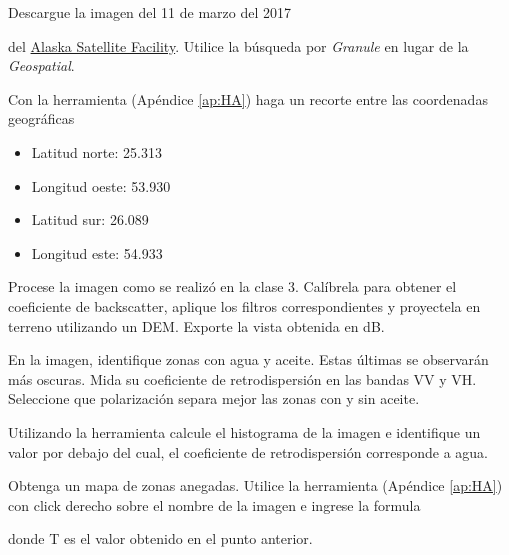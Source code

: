 \begin{que}
    Descargue la imagen del 11 de marzo del 2017
    \begin{center}\end{center} del \href{https://vertex.daac.asf.alaska.edu/}{Alaska Satellite Facility}. Utilice la búsqueda por \emph{Granule} en lugar de la \emph{Geospatial}.
\end{que}

\begin{que}
    Con la herramienta  (Apéndice \ref{ap:HA}) haga un recorte entre las coordenadas geográficas
    \begin{itemize}
        \item Latitud norte: 25.313
        \item Longitud oeste: 53.930
        \item Latitud sur: 26.089
        \item Longitud este: 54.933
    \end{itemize}

\end{que}

\begin{que}
    Procese la imagen como se realizó en la clase 3. Calíbrela para obtener el coeficiente de backscatter, aplique los filtros correspondientes y proyectela en terreno utilizando un DEM. Exporte la vista obtenida en dB.
\end{que}

\begin{que}
    En la imagen, identifique zonas con agua y aceite. Estas últimas se observarán más oscuras. Mida su coeficiente de retrodispersión en las bandas VV y VH. Seleccione que polarización separa mejor las zonas con y sin aceite.
\end{que}


\begin{que}
    Utilizando la herramienta  calcule el histograma de la imagen e identifique un valor por debajo del cual, el coeficiente de retrodispersión corresponde a agua.
\end{que}

\begin{que}
  Obtenga un mapa de zonas anegadas. Utilice la herramienta  (Apéndice \ref{ap:HA}) con click derecho sobre el nombre de la imagen e ingrese la formula
  \begin{center}
  \end{center}
  donde T es el valor obtenido en el punto anterior.
\end{que}


